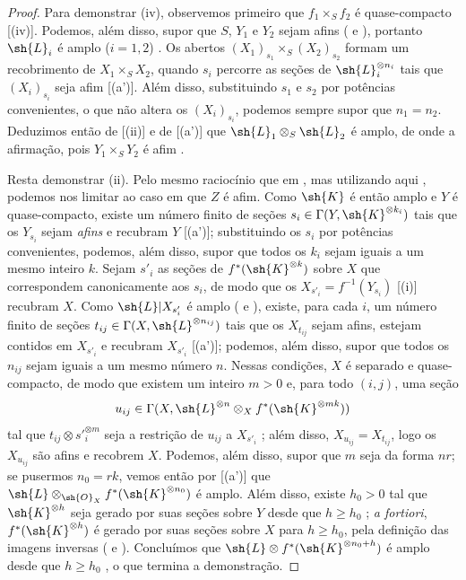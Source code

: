 \documentclass[oneside,10pt]{amsart}
\renewcommand{\geq}{\geqslant}
\newcommand{\oldpage}[2][]{\marginnote{\normalfont\footnotesize\textbf{#1}~|~#2}\ignorespaces}
\begin{document}
\begin{proof}
Para demonstrar (iv), observemos primeiro que $f_1\times_S f_2$ é quase-compacto [(iv)].
Podemos, além disso, supor que $S$, $Y_1$ e $Y_2$ sejam afins ( e ), portanto $\sh{L}_i$ é amplo ($i=1,2$) .
Os abertos $(X_1)_{s_1}\times_S(X_2)_{s_2}$ formam um recobrimento de $X_1\times_S X_2$, quando $s_i$ percorre as seções de $\sh{L}_i^{\otimes n_i}$ tais que $(X_i)_{s_i}$ seja afim [(a')].
Além disso, substituindo $s_1$ e $s_2$ por potências convenientes, o que não altera os $(X_i)_{s_i}$, podemos sempre supor que $n_1=n_2$.
Deduzimos então de [(ii)] e de [(a')] que $\sh{L}_1\otimes_S\sh{L}_2$ é amplo, de onde a afirmação, pois $Y_1\times_S Y_2$ é afim .

Resta demonstrar (ii).
Pelo mesmo raciocínio que em , mas utilizando aqui , podemos nos limitar ao caso em que $Z$ é afim.
Como $\sh{K}$ é então amplo e $Y$ é quase-compacto, existe um número finito de seções $s_i\in\Gamma(Y,\sh{K}^{\otimes k_i})$ tais que os $Y_{s_i}$
\oldpage[II]{93}
sejam \emph{afins} e recubram $Y$ [(a')];
substituindo os $s_i$ por potências convenientes, podemos, além disso, supor que todos os $k_i$ sejam iguais a um mesmo inteiro $k$.
Sejam $s'_i$ as seções de $f^*(\sh{K}^{\otimes k})$ sobre $X$ que correspondem canonicamente aos $s_i$, de modo que os $X_{s'_i}=f^{-1}(Y_{s_i})$ [(i)] recubram $X$.
Como $\sh{L}|X_{s'_i}$ é amplo ( e ), existe, para cada $i$, um número finito de seções $t_{ij}\in\Gamma(X,\sh{L}^{\otimes n_{ij}})$ tais que os $X_{t_{ij}}$ sejam afins, estejam contidos em $X_{s'_i}$ e recubram $X_{s'_i}$ [(a')];
podemos, além disso, supor que todos os $n_{ij}$ sejam iguais a um mesmo número $n$.
Nessas condições, $X$ é separado e quase-compacto, de modo que existem um inteiro $m>0$ e, para todo $(i,j)$, uma seção
\[
  u_{ij}\in\Gamma(X,\sh{L}^{\otimes n}\otimes_X f^*(\sh{K}^{\otimes mk}))
\]
tal que $t_{ij}\otimes s'^{\otimes m}_i$ seja a restrição de $u_{ij}$ a $X_{s'_i}$ ;
além disso, $X_{u_{ij}}=X_{t_{ij}}$, logo os $X_{u_{ij}}$ são afins e recobrem $X$.
Podemos, além disso, supor que $m$ seja da forma $nr$;
se pusermos $n_0=rk$, vemos então por [(a')] que $\sh{L}\otimes_{\sh{O}_X}f^*(\sh{K}^{\otimes n_0})$ é amplo.
Além disso, existe $h_0>0$ tal que $\sh{K}^{\otimes h}$ seja gerado por suas seções sobre $Y$ desde que $h\geq h_0$ ;
\emph{a fortiori}, $f^*(\sh{K}^{\otimes h})$ é gerado por suas seções sobre $X$ para $h\geq h_0$, pela definição das imagens inversas ( e ).
Concluímos que $\sh{L}\otimes f^*(\sh{K}^{\otimes n_0+h})$ é amplo desde que $h\geq h_0$ , o que termina a demonstração.
\end{proof}
\end{document}
